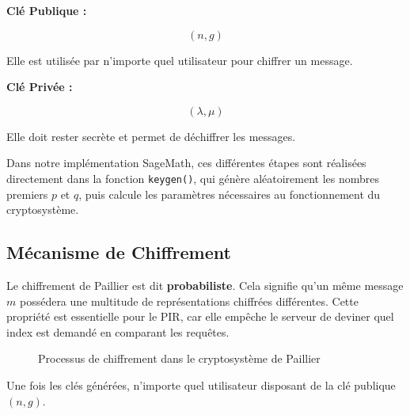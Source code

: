 \documentclass[12pt,a4paper]{report}
\begin{document}
\textbf{Clé Publique :} 


\[
(n, g)
\]

Elle est utilisée par n'importe quel utilisateur pour chiffrer un message.



\textbf{Clé Privée :} 

\[
(\lambda, \mu)
\]

Elle doit rester secrète et permet de déchiffrer les messages.


Dans notre implémentation SageMath, ces différentes étapes sont réalisées
directement dans la fonction \texttt{keygen()}, qui génère aléatoirement les
nombres premiers $p$ et $q$, puis calcule les paramètres nécessaires au
fonctionnement du cryptosystème.

\newpage
\subsection{Mécanisme de Chiffrement}


Le chiffrement de Paillier est dit \textbf{probabiliste}. Cela signifie qu'un même message $m$ possédera une multitude de représentations chiffrées différentes. Cette propriété est essentielle pour le PIR, car elle empêche le serveur de deviner quel index est demandé en comparant les requêtes.

\begin{figure}[h]
\centering
{}

\caption{Processus de chiffrement dans le cryptosystème de Paillier}
\end{figure}


Une fois les clés générées, n'importe quel utilisateur disposant de la clé
publique $(n,g)$.
\end{document}
